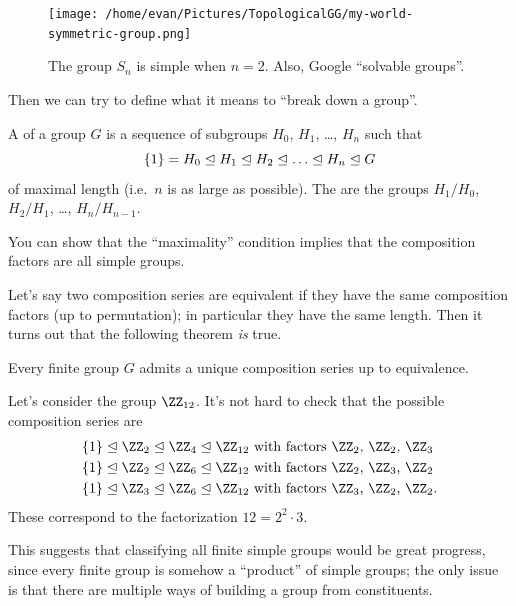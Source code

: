 \begin{figure}[ht]
	\centering
	\texttt{[image: /home/evan/Pictures/TopologicalGG/my-world-symmetric-group.png]}
	\caption{The group $S_n$ is simple when $n=2$. Also, Google ``solvable groups''.}
\end{figure}


Then we can try to define what it means to ``break down a group''.
\begin{definition}
	A  of a group $G$ is a sequence of subgroups
	$H_0$, $H_1$, \dots, $H_n$ such that
	\[ \{1\} = H_0 \normalin H_1 \normalin H_2 \normalin \dots \normalin H_n
		\normalin G \]
	of maximal length (i.e.\ $n$ is as large as possible).
	The  are the groups
	$H_1/H_0$, $H_2/H_1$, \dots, $H_n/H_{n-1}$.
\end{definition}
You can show that the ``maximality'' condition implies that the composition factors are all simple groups.

Let's say two composition series are equivalent if they have the same composition factors (up to permutation); in particular they have the same length.
Then it turns out that the following theorem \emph{is} true.
\begin{theorem}
	Every finite group $G$ admits a unique composition series up to equivalence.
\end{theorem}

\begin{example}
	[Fundamental Theorem of Arithmetic when $n=12$]
	Let's consider the group $\Zc{12}$.
	It's not hard to check that the possible composition series are
	\begin{align*}
		\{1\} \normalin \Zc2 \normalin \Zc4 \normalin \Zc{12}
		& \text{ with factors $\Zc2$, $\Zc2$, $\Zc3$} \\
		\{1\} \normalin \Zc2 \normalin \Zc6 \normalin \Zc{12}
		& \text{ with factors $\Zc2$, $\Zc3$, $\Zc2$} \\
		\{1\} \normalin \Zc3 \normalin \Zc6 \normalin \Zc{12}
		& \text{ with factors $\Zc3$, $\Zc2$, $\Zc2$}.
	\end{align*}
	These correspond to the factorization $12 = 2^2 \cdot 3$.
\end{example}

This suggests that classifying all finite simple groups would be great progress, since every finite group is somehow a ``product'' of simple groups;
the only issue is that there are multiple ways of building a group from constituents.

